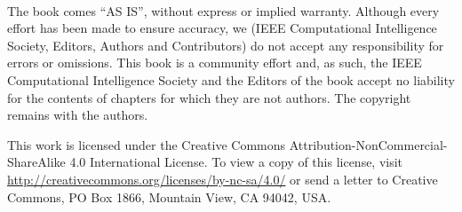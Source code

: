 
\ 
\vspace{7cm}

The book comes “AS IS”, without express or implied warranty. Although every effort has been made to ensure accuracy, we (IEEE Computational Intelligence Society, Editors, Authors and Contributors) do not accept any responsibility for errors or omissions.
This book is a community effort and, as such, the IEEE Computational Intelligence Society and the Editors of the book accept no liability for the contents of chapters for which they are not authors. The copyright remains with the authors.

This work is licensed under the Creative Commons Attribution-NonCommercial-ShareAlike 4.0 International License. To view a copy of this license, visit \url{http://creativecommons.org/licenses/by-nc-sa/4.0/} or send a letter to Creative Commons, PO Box 1866, Mountain View, CA 94042, USA.

